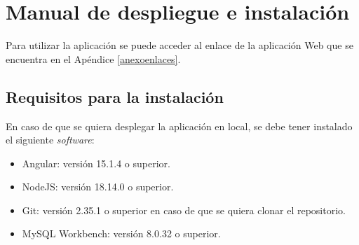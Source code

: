 
\section{Manual de despliegue e instalación} 

Para utilizar la aplicación se puede acceder al enlace de la aplicación Web que se encuentra en el Apéndice \ref{anexoenlaces}.

\subsection{Requisitos para la instalación}
En caso de que se quiera desplegar la aplicación en local, se debe tener instalado el siguiente \textit{software}:
\begin{itemize}
    \item Angular: versión 15.1.4 o superior.
    \item NodeJS: versión 18.14.0 o superior.
    \item Git: versión 2.35.1 o superior en caso de que se quiera clonar el repositorio.
    \item MySQL Workbench: versión 8.0.32 o superior.
\end{itemize} 


